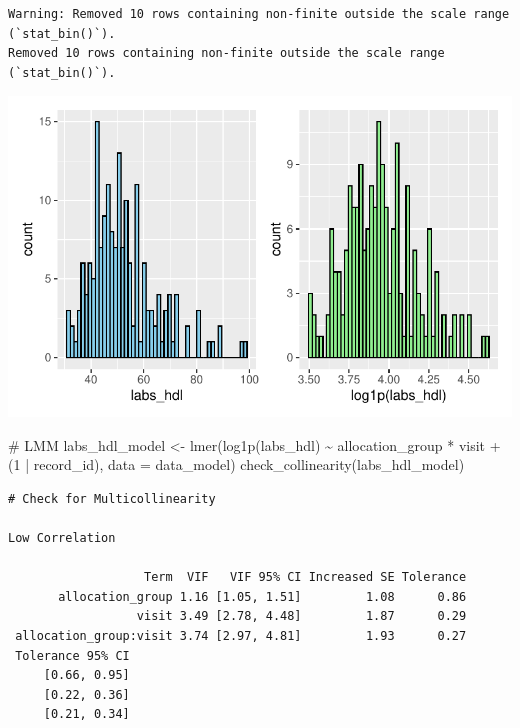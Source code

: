 \documentclass[
  letterpaper,
  DIV=11,
  numbers=noendperiod]{scrartcl}
\newenvironment{Shaded}{\begin{snugshade}}{\end{snugshade}}
\newcommand{\AttributeTok}[1]{\textcolor[rgb]{0.40,0.45,0.13}{#1}}
\newcommand{\CommentTok}[1]{\textcolor[rgb]{0.37,0.37,0.37}{#1}}
\newcommand{\DecValTok}[1]{\textcolor[rgb]{0.68,0.00,0.00}{#1}}
\newcommand{\FunctionTok}[1]{\textcolor[rgb]{0.28,0.35,0.67}{#1}}
\newcommand{\NormalTok}[1]{\textcolor[rgb]{0.00,0.23,0.31}{#1}}
\newcommand{\OtherTok}[1]{\textcolor[rgb]{0.00,0.23,0.31}{#1}}
\newcommand{\SpecialCharTok}[1]{\textcolor[rgb]{0.37,0.37,0.37}{#1}}
\begin{document}
\begin{verbatim}
Warning: Removed 10 rows containing non-finite outside the scale range (`stat_bin()`).
Removed 10 rows containing non-finite outside the scale range (`stat_bin()`).
\end{verbatim}

\includegraphics{Outcomes_V1V2V3_files/figure-pdf/labs_hdl_1-1.pdf}

\begin{Shaded}
\begin{Highlighting}[]
\CommentTok{\# LMM}
\NormalTok{labs\_hdl\_model }\OtherTok{\textless{}{-}} \FunctionTok{lmer}\NormalTok{(}\FunctionTok{log1p}\NormalTok{(labs\_hdl) }\SpecialCharTok{\textasciitilde{}}\NormalTok{ allocation\_group }\SpecialCharTok{*}\NormalTok{ visit }\SpecialCharTok{+}\NormalTok{ (}\DecValTok{1} \SpecialCharTok{|}\NormalTok{ record\_id), }\AttributeTok{data =}\NormalTok{ data\_model)}
\FunctionTok{check\_collinearity}\NormalTok{(labs\_hdl\_model)}
\end{Highlighting}
\end{Shaded}

\begin{verbatim}
# Check for Multicollinearity

Low Correlation

                   Term  VIF   VIF 95% CI Increased SE Tolerance
       allocation_group 1.16 [1.05, 1.51]         1.08      0.86
                  visit 3.49 [2.78, 4.48]         1.87      0.29
 allocation_group:visit 3.74 [2.97, 4.81]         1.93      0.27
 Tolerance 95% CI
     [0.66, 0.95]
     [0.22, 0.36]
     [0.21, 0.34]
\end{verbatim}
\end{document}
